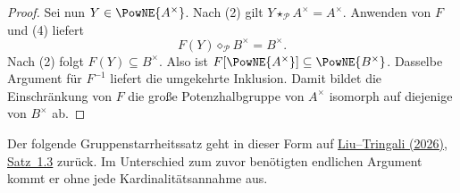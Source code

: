 \documentclass[main.tex]{subfiles}
\begin{document}
\begin{proof}
Sei nun \(Y\in\PowNE{A^\times}\).  Nach (2) gilt
\(Y\star_{\mathcal P}A^\times=A^\times\).  Anwenden von \(F\) und (4)
liefert
\[
  F(Y)\diamond_{\mathcal P}B^\times=B^\times.
\]
Nach (2) folgt \(F(Y)\subseteq B^\times\).  Also ist
\(F[\PowNE{A^\times}]\subseteq\PowNE{B^\times}\).  Dasselbe Argument für
\(F^{-1}\) liefert die umgekehrte Inklusion.  Damit bildet die
Einschränkung von \(F\) die große Potenzhalbgruppe von \(A^\times\)
isomorph auf diejenige von \(B^\times\) ab.
\end{proof}

Der folgende Gruppenstarrheitssatz geht in dieser Form auf
\href{https://doi.org/10.48550/arXiv.2606.01917}%
  {Liu--Tringali (2026), Satz~1.3}
zurück.  Im Unterschied zum zuvor benötigten endlichen Argument kommt er
ohne jede Kardinalitätsannahme aus.
\end{document}
